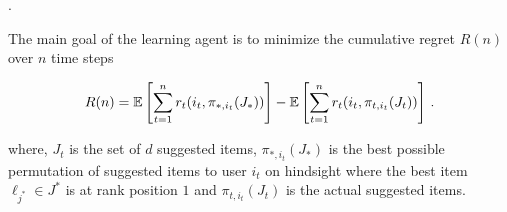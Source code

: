.



The main goal of the learning agent is to minimize the cumulative regret $R(n)$  over $n$ time steps

\begin{align*}
  R(n) =
  \mathbb{E}\left[\sum_{t = 1}^n r_t(i_t, \pi_{\ast, i_t}(J_\ast))\right] - \mathbb{E}\left[\sum_{t = 1}^n r_t(i_t, \pi_{t, i_t}(J_t))\right]\,.
\end{align*}

where, $J_t$ is the set of $d$ suggested items, $\pi_{\ast, i_t}(J_\ast)$ is the best possible permutation of suggested items to user $i_t$ on hindsight where the best item $\ell_{j^*}\in J^*$ is at rank position $1$ and $\pi_{t, i_t}(J_t)$ is the actual suggested items.


%
%
